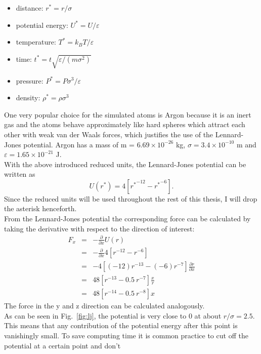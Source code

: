 \documentclass[12pt]{article}
\begin{document}
\begin{itemize}
    \item {distance:} $r^* = r/\sigma$
    \item {potential energy:} $U^* = U/\varepsilon$
    \item {temperature:} $T^* = k_B T/\varepsilon$
    \item {time:} $t^* = t\sqrt{\varepsilon/(m\sigma^2)}$
    \item {pressure:} $P^* = P\sigma^3/\varepsilon$
    \item {density:} $\rho^* = \rho \sigma^3$
\end{itemize}
One very popular choice for the simulated atoms is Argon because it is an inert gas and the atoms behave 
approximately like hard spheres which attract each other with weak van der Waals forces, which justifies the use of the Lennard-Jones potential. 
Argon has a mass of m = $6.69 \times 10^{-26}$ kg, $\sigma = 3.4 \times 10^{-10}$ m and $\varepsilon = 1.65 \times 10^{-21}$ J.\\
With the above introduced reduced units, the Lennard-Jones potential can be written as
\begin{equation}
    U(r^*) = 4\left[{r^*}^{-12} - {r^*}^{-6}\right].
\end{equation}
Since the reduced units will be used throughout the rest of this thesis, I will drop the asterisk henceforth.\\
From the Lennard-Jones potential the corresponding force can be calculated by taking the derivative with respect to the direction of interest:
\begin{eqnarray}
    F_{x} &=& -\frac{\partial}{\partial x} U(r) \nonumber\\
                &=& -\frac{\partial}{\partial x} 4\left[{r}^{-12} - {r}^{-6}\right] \nonumber\\
                &=& -4 \left[(-12){r}^{-13} - (-6){r}^{-7}\right] \frac{\partial r}{\partial x} \nonumber\\
                &=& 48 \left[r^{-13} - 0.5 \ r^{-7}\right] \frac{x}{r} \nonumber\\
    \label{eq:ljforce} &=& 48 \left[r^{-14} - 0.5 \ r^{-8}\right] x
\end{eqnarray}
The force in the y and z direction can be calculated analogously.\\
As can be seen in Fig.~\ref{fig:lj}, the potential is very close to 0 at about $r/\sigma=2.5$. This means that any contribution of the potential
energy after this point is vanishingly small. To save computing time it is common practice to cut off the potential at a certain point and don't
\end{document}
